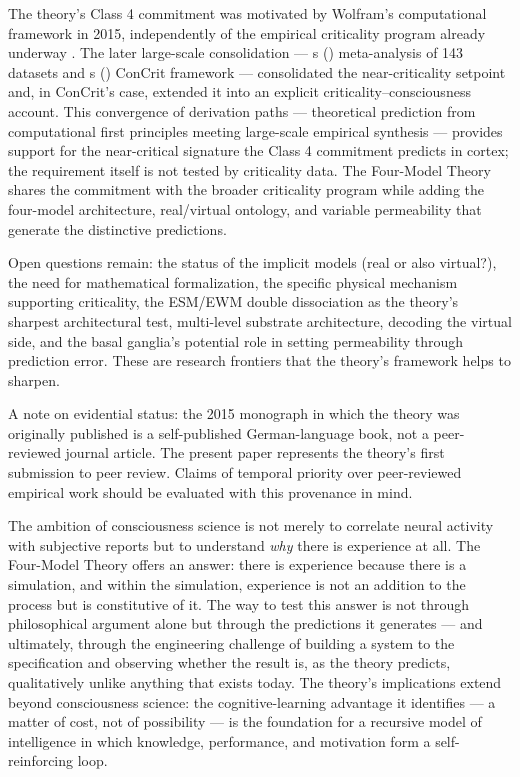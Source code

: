 \documentclass[12pt]{article}
\newcommand{\revend}{}
\begin{document}
{The theory's Class 4 commitment was motivated by Wolfram's computational framework in 2015, independently of the empirical criticality program already underway \citep{Beggs2003,CarhartHarris2014}. The later large-scale consolidation --- \citeauthor{HengenShew2025}\textquotesingle s (\citeyear{HengenShew2025}) meta-analysis of 143 datasets and \citeauthor{AlgomShriki2026}\textquotesingle s (\citeyear{AlgomShriki2026}) ConCrit framework --- consolidated the near-criticality setpoint and, in ConCrit's case, extended it into an explicit criticality--consciousness account. This convergence of derivation paths --- theoretical prediction from computational first principles meeting large-scale empirical synthesis --- provides support for the near-critical signature the Class 4 commitment predicts in cortex; the requirement itself is not tested by criticality data. The Four-Model Theory shares the commitment with the broader criticality program while adding the four-model architecture, real/virtual ontology, and variable permeability that generate the distinctive predictions.

Open questions remain: the status of the implicit models (real or also virtual?), the need for mathematical formalization, the specific physical mechanism supporting criticality, the ESM/EWM double dissociation as the theory's sharpest architectural test, multi-level substrate architecture, decoding the virtual side, and the basal ganglia's potential role in setting permeability through prediction error. These are research frontiers that the theory's framework helps to sharpen.

A note on evidential status: the 2015 monograph \citep{Gruber2015} in which the theory was originally published is a self-published German-language book, not a peer-reviewed journal article. The present paper represents the theory's first submission to peer review. Claims of temporal priority over peer-reviewed empirical work should be evaluated with this provenance in mind.\revend}

The ambition of consciousness science is not merely to correlate neural activity with subjective reports but to understand \emph{why} there is experience at all. The Four-Model Theory offers an answer: there is experience because there is a simulation, and within the simulation, experience is not an addition to the process but is constitutive of it. The way to test this answer is not through philosophical argument alone but through the predictions it generates --- and ultimately, through the engineering challenge of building a system to the specification and observing whether the result is, as the theory predicts, qualitatively unlike anything that exists today. The theory's implications extend beyond consciousness science: the cognitive-learning advantage it identifies — a matter of cost, not of possibility — is the foundation for a recursive model of intelligence \citep{Gruber2026a} in which knowledge, performance, and motivation form a self-reinforcing loop.
\end{document}
